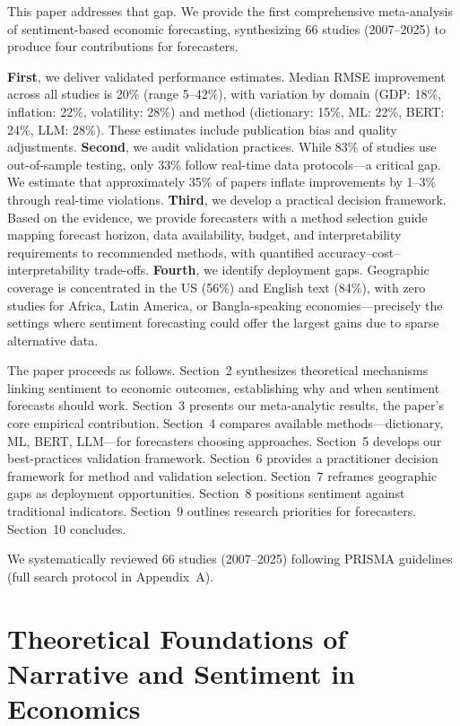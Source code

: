 \documentclass[11pt]{article}
\begin{document}
This paper addresses that gap. We provide the first comprehensive meta-analysis of sentiment-based economic forecasting, synthesizing 66 studies (2007--2025) to produce four contributions for forecasters.

\textbf{First}, we deliver validated performance estimates. Median RMSE improvement across all studies is 20\% (range 5--42\%), with variation by domain (GDP: 18\%, inflation: 22\%, volatility: 28\%) and method (dictionary: 15\%, ML: 22\%, BERT: 24\%, LLM: 28\%). These estimates include publication bias and quality adjustments. \textbf{Second}, we audit validation practices. While 83\% of studies use out-of-sample testing, only 33\% follow real-time data protocols---a critical gap. We estimate that approximately 35\% of papers inflate improvements by 1--3\% through real-time violations. \textbf{Third}, we develop a practical decision framework. Based on the evidence, we provide forecasters with a method selection guide mapping forecast horizon, data availability, budget, and interpretability requirements to recommended methods, with quantified accuracy--cost--interpretability trade-offs. \textbf{Fourth}, we identify deployment gaps. Geographic coverage is concentrated in the US (56\%) and English text (84\%), with zero studies for Africa, Latin America, or Bangla-speaking economies---precisely the settings where sentiment forecasting could offer the largest gains due to sparse alternative data.

The paper proceeds as follows. Section~2 synthesizes theoretical mechanisms linking sentiment to economic outcomes, establishing why and when sentiment forecasts should work. Section~3 presents our meta-analytic results, the paper's core empirical contribution. Section~4 compares available methods---dictionary, ML, BERT, LLM---for forecasters choosing approaches. Section~5 develops our best-practices validation framework. Section~6 provides a practitioner decision framework for method and validation selection. Section~7 reframes geographic gaps as deployment opportunities. Section~8 positions sentiment against traditional indicators. Section~9 outlines research priorities for forecasters. Section~10 concludes.

We systematically reviewed 66 studies (2007--2025) following PRISMA guidelines (full search protocol in Appendix~A).

\newpage
\section{Theoretical Foundations of Narrative and Sentiment in Economics}
\end{document}
